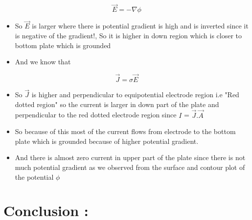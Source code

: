 \documentclass[11pt, a4paper]{article}
\begin{document}
  \begin{equation}
  \vec{E} = -\nabla{\phi}
     \end{equation}
  
  \begin{itemize}
  \item
    So \(\vec{E}\) is larger where there is potential gradient is high and
    is inverted since it is negative of the gradient!, So it is higher in
    down region which is closer to bottom plate which is grounded
  \item
    And we know that
  \end{itemize}
  
  \begin{equation}
  \vec{J} = \sigma\vec{E}
     \end{equation}
  
  \begin{itemize}
  \item
    So \(\vec{J}\) is higher and perpendicular to equipotential electrode
    region i.e "Red dotted region" so the current is larger in down part
    of the plate and perpendicular to the red dotted electrode region
    since \(I\) = \(\vec{J}.\vec{A}\)
  \item
    So because of this most of the current flows from electrode to the
    bottom plate which is grounded because of higher potential gradient.
  \item
    And there is almost zero current in upper part of the plate since
    there is not much potential gradient as we observed from the surface
    and contour plot of the potential \(\phi\)
  \end{itemize}
  
    
  
    
      
      \section{Conclusion :}\label{results-and-conclusion}
  
\end{document}
